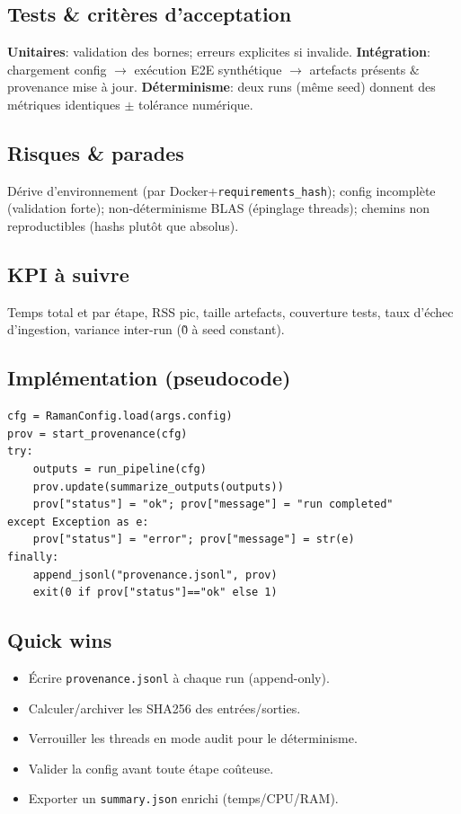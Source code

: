 \subsection{Tests \& critères d'acceptation}
\textbf{Unitaires}: validation des bornes; erreurs explicites si invalide. \textbf{Intégration}: chargement config $\rightarrow$ exécution E2E synthétique $\rightarrow$ artefacts présents $\&$ provenance mise à jour. \textbf{Déterminisme}: deux runs (même seed) donnent des métriques identiques $\pm$ tolérance numérique.

\subsection{Risques \& parades}
Dérive d'environnement (par Docker+\texttt{requirements\_hash}); config incomplète (validation forte); non-déterminisme BLAS (épinglage threads); chemins non reproductibles (hashs plutôt que absolus).

\subsection{KPI à suivre}
Temps total et par étape, RSS pic, taille artefacts, couverture tests, taux d'échec d'ingestion, variance inter-run (\~0 à seed constant).

\subsection{Implémentation (pseudocode)}
\begin{lstlisting}[basicstyle=\ttfamily\small]
cfg = RamanConfig.load(args.config)
prov = start_provenance(cfg)
try:
    outputs = run_pipeline(cfg)
    prov.update(summarize_outputs(outputs))
    prov["status"] = "ok"; prov["message"] = "run completed"
except Exception as e:
    prov["status"] = "error"; prov["message"] = str(e)
finally:
    append_jsonl("provenance.jsonl", prov)
    exit(0 if prov["status"]=="ok" else 1)
\end{lstlisting}

\subsection{Quick wins}
\begin{itemize}[nosep]
\item Écrire \texttt{provenance.jsonl} à chaque run (append-only).
\item Calculer/archiver les SHA256 des entrées/sorties.
\item Verrouiller les threads en mode audit pour le déterminisme.
\item Valider la config avant toute étape coûteuse.
\item Exporter un \texttt{summary.json} enrichi (temps/CPU/RAM).
\end{itemize}
